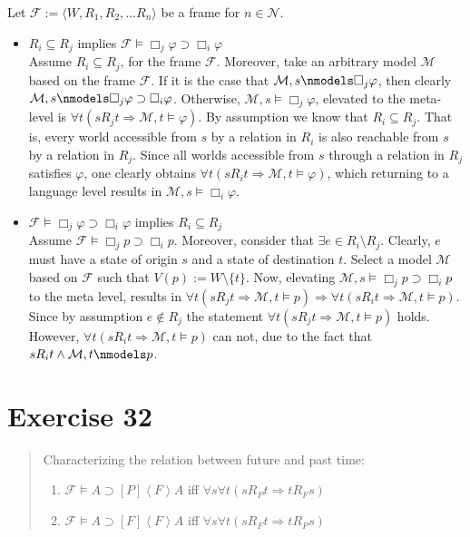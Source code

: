 \documentclass[11pt,a4paper]{article}
\newcommand{\lto}{\supset}
\newcommand{\all}{\Box}
\newcommand{\tall}[1]{\left[ #1 \right]}
\newcommand{\tsome}[1]{\left\langle  #1 \right\rangle}
\newcommand{\sto}{\Rightarrow}
\begin{document}
Let $\mathcal{F}:=\langle W, R_1, R_2, \dots R_n \rangle$ be a frame for $n \in \mathcal{N}$.
\begin{itemize}


\item $R_i \subseteq R_j$ implies $\mathcal{F} \models \all_j \varphi \lto \all_i \varphi$ \\
Assume $R_i \subseteq R_j$, for the frame $\mathcal{F}$. Moreover, take an arbitrary model $\mathcal{M}$ based on the frame $\mathcal{F}$. If it is the case that $\mathcal{M},s \nmodels \all_j \varphi$, then clearly $\mathcal{M},s \nmodels \all_j \varphi \lto \all_i \varphi$. Otherwise, $\mathcal{M},s \models \all_j \varphi$, elevated to the meta-level is $\forall t (sR_jt \sto \mathcal{M}, t \models \varphi)$. By assumption we know that $R_i \subseteq R_j$. That is, every world accessible from $s$ by a relation in $R_i$ is also reachable from $s$ by a relation in $R_j$. Since all worlds accessible from $s$ through a relation in $R_j$ satisfies $\varphi$, one clearly obtains $\forall t (sR_it \sto \mathcal{M}, t \models \varphi)$, which returning to a language level results in $\mathcal{M}, s \models \all_i \varphi$.


\item $\mathcal{F} \models \all_j \varphi \lto \all_i \varphi$ implies $R_i \subseteq R_j$ \\
Assume $\mathcal{F} \models \all_j p \lto \all_i p$. Moreover, consider that $\exists e \in R_i \setminus R_j$. Clearly, $e$ must have a state of origin $s$ and a state of destination $t$. Select a model $\mathcal{M}$ based on $\mathcal{F}$ such that $V(p):= W \setminus \{t\}$. Now, elevating $\mathcal{M}, s \models  \all_j p \lto \all_i p$ to the meta level, results in $\forall t (sR_jt \sto \mathcal{M}, t \models p) \sto \forall t (sR_it \sto \mathcal{M}, t \models p)$. Since by assumption $e \nin R_j$ the statement $\forall t (sR_jt \sto \mathcal{M}, t \models p)$ holds. However, $\forall t (sR_it \sto \mathcal{M}, t \models p)$ can not, due to the fact that $sR_it \land \mathcal{M}, t \nmodels p$.


\end{itemize}




\section*{Exercise 32}
\begin{quote}
Characterizing the relation between future and past time:
\begin{enumerate}
\item $\mathcal{F}\models A \lto \tall{P} \tsome{F} A$ iff $\forall s \forall	t (sR_Pt \sto tR_Fs)$
\item $\mathcal{F}\models A \lto \tall{F} \tsome{F} A$ iff $\forall s \forall	t (sR_Ft \sto tR_Ps)$
\end{enumerate}
\end{quote}
\end{document}
